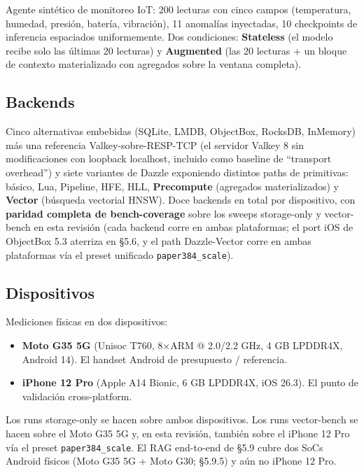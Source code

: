 Agente sintético de monitoreo IoT: 200 lecturas con cinco campos (temperatura,
humedad, presión, batería, vibración), 11 anomalías inyectadas, 10 checkpoints
de inferencia espaciados uniformemente. Dos condiciones: \textbf{Stateless} (el
modelo recibe solo las últimas 20 lecturas) y \textbf{Augmented} (las 20
lecturas + un bloque de contexto materializado con agregados sobre la ventana
completa).

\subsection{Backends}\label{backends}

Cinco alternativas embebidas (SQLite, LMDB, ObjectBox, RocksDB, InMemory) más
una referencia Valkey-sobre-RESP-TCP (el servidor Valkey 8 sin modificaciones
con loopback localhost, incluido como baseline de ``transport overhead'') y
siete variantes de Dazzle exponiendo distintos paths de primitivas: básico, Lua,
Pipeline, HFE, HLL, \textbf{Precompute} (agregados materializados) y
\textbf{Vector} (búsqueda vectorial HNSW). Doce backends en total por
dispositivo, con \textbf{paridad completa de bench-coverage} sobre los sweeps
storage-only y vector-bench en esta revisión (cada backend corre en ambas
plataformas; el port iOS de ObjectBox 5.3 aterriza en §5.6, y el path
Dazzle-Vector corre en ambas plataformas vía el preset unificado
\texttt{paper384\_scale}).

\subsection{Dispositivos}\label{dispositivos}

Mediciones físicas en dos dispositivos:

\begin{itemize}
\tightlist
\item
  \textbf{Moto G35 5G} (Unisoc T760, 8×ARM @ 2.0/2.2 GHz, 4 GB LPDDR4X, Android
  14). El handset Android de presupuesto / referencia.
\item
  \textbf{iPhone 12 Pro} (Apple A14 Bionic, 6 GB LPDDR4X, iOS 26.3). El punto de
  validación cross-platform.
\end{itemize}

Los runs storage-only se hacen sobre ambos dispositivos. Los runs vector-bench
se hacen sobre el Moto G35 5G y, en esta revisión, también sobre el iPhone 12
Pro vía el preset \texttt{paper384\_scale}. El RAG end-to-end de §5.9 cubre dos
SoCs Android físicos (Moto G35 5G + Moto G30; §5.9.5) y aún no iPhone 12 Pro.

